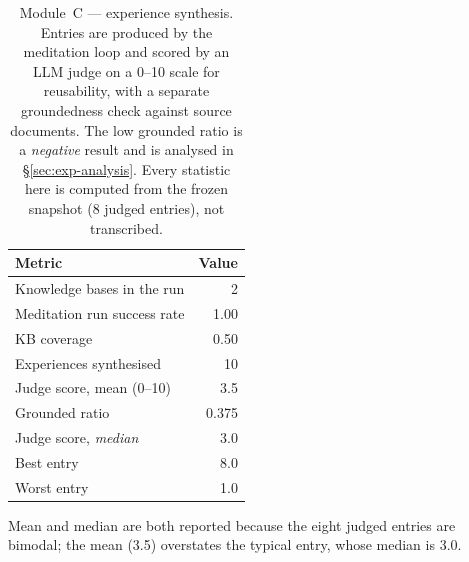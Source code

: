 \begin{table}[t]
\centering
\footnotesize
\caption{Module~C --- experience synthesis. Entries are produced by the meditation
loop and scored by an LLM judge on a 0--10 scale for reusability, with a separate
groundedness check against source documents. The low grounded ratio is a
\emph{negative} result and is analysed in \S\ref{sec:exp-analysis}. Every
statistic here is computed from the frozen snapshot (8 judged
entries), not transcribed.}
\label{tab:experience}
\begin{tabular}{@{}lr@{}}
\toprule
Metric & Value \\
\midrule
Knowledge bases in the run            & 2 \\
Meditation run success rate           & 1.00 \\
KB coverage                           & 0.50 \\
Experiences synthesised               & 10 \\
Judge score, mean (0--10)             & 3.5 \\
Grounded ratio                        & 0.375 \\
\midrule
Judge score, \emph{median}          & 3.0 \\
Best entry                            & 8.0 \\
Worst entry                           & 1.0 \\
\bottomrule
\end{tabular}

\par\smallskip
\parbox{\columnwidth}{\scriptsize Mean and median are both reported because the
eight judged entries are bimodal; the mean (3.5)
overstates the typical entry, whose median is 3.0.}
\end{table}
